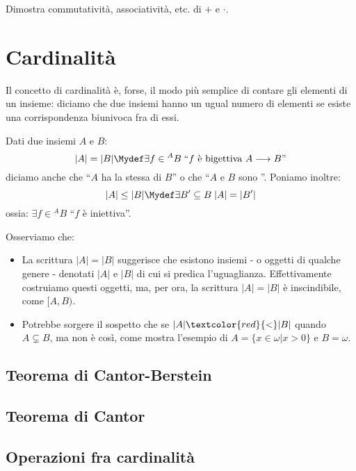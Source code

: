 \documentclass[11pt]{scrartcl}
\begin{document}
\begin{exercise}
	Dimostra commutatività, associatività, etc. di $+$ e $\cdot$.
\end{exercise}

\newpage
\section{Cardinalità}
Il concetto di cardinalità è, forse, il modo più semplice di contare gli elementi di un insieme: diciamo che due insiemi hanno un ugual numero di elementi se esiste
una corrispondenza biunivoca fra di essi.

\begin{definition}
	Dati due insiemi $A$ e $B$:
	\[ |A| = |B| \Mydef \exists f \in {}^A B \; \text{``$f$ è bigettiva $A \longrightarrow B$''}
		\]
	diciamo anche che ``$A$ ha la stessa  di $B$'' o che ``$A$ e $B$ sono ''. Poniamo inoltre:
	\[ |A| \leq |B| \Mydef \exists B' \subseteq B \; |A| = |B'| 
		\]
	ossia: $\exists f \in {}^A B$ ``$f$ è iniettiva''.
\end{definition}

\begin{note}
	Osserviamo che:
	\begin{itemize}
		\item La scrittura $|A| = |B|$ suggerisce che esistono insiemi - o oggetti di qualche genere - denotati $|A|$ e $|B|$ di cui si predica l'uguaglianza.
		Effettivamente costruiamo questi oggetti, ma, per ora, la scrittura $|A| = |B|$ è inscindibile, come $[A,B)$.
		\item Potrebbe sorgere il sospetto che se $|A|\textcolor{red}{<}|B|$ quando $A \subsetneq B$, ma non è così, come mostra l'esempio di $A = \{x \in \omega | x > 0\}$ e $B = \omega$.
	\end{itemize}
\end{note}

\subsection{Teorema di Cantor-Berstein}
\newpage
\subsection{Teorema di Cantor}
\newpage
\subsection{Operazioni fra cardinalità}
\end{document}
